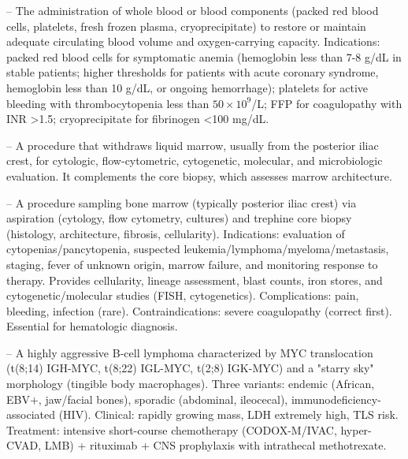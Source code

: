 -- The administration of whole blood or blood components (packed red blood cells, platelets, fresh frozen plasma, cryoprecipitate) to restore or maintain adequate circulating blood volume and oxygen-carrying capacity. Indications: packed red blood cells for symptomatic anemia (hemoglobin less than 7-8 g/dL in stable patients; higher thresholds for patients with acute coronary syndrome, hemoglobin less than 10 g/dL, or ongoing hemorrhage); platelets for active bleeding with thrombocytopenia less than $50 \times 10^9$/L; FFP for coagulopathy with INR >1.5; cryoprecipitate for fibrinogen <100 mg/dL.

-- A procedure that withdraws liquid marrow, usually from the posterior iliac crest, for cytologic, flow-cytometric, cytogenetic, molecular, and microbiologic evaluation. It complements the core biopsy, which assesses marrow architecture.

-- A procedure sampling bone marrow (typically posterior iliac crest) via aspiration (cytology, flow cytometry, cultures) and trephine core biopsy (histology, architecture, fibrosis, cellularity). Indications: evaluation of cytopenias/pancytopenia, suspected leukemia/lymphoma/myeloma/metastasis, staging, fever of unknown origin, marrow failure, and monitoring response to therapy. Provides cellularity, lineage assessment, blast counts, iron stores, and cytogenetic/molecular studies (FISH, cytogenetics). Complications: pain, bleeding, infection (rare). Contraindications: severe coagulopathy (correct first). Essential for hematologic diagnosis.

-- A highly aggressive B-cell lymphoma characterized by MYC translocation (t(8;14) IGH-MYC, t(8;22) IGL-MYC, t(2;8) IGK-MYC) and a "starry sky" morphology (tingible body macrophages). Three variants: endemic (African, EBV+, jaw/facial bones), sporadic (abdominal, ileocecal), immunodeficiency-associated (HIV). Clinical: rapidly growing mass, LDH extremely high, TLS risk. Treatment: intensive short-course chemotherapy (CODOX-M/IVAC, hyper-CVAD, LMB) + rituximab + CNS prophylaxis with intrathecal methotrexate.

